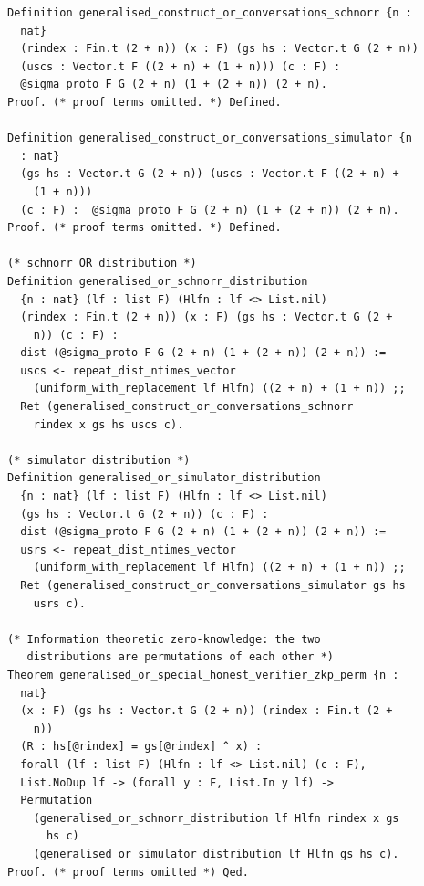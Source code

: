 \documentclass[sigconf,anonymous,review]{acmart}
\begin{document}
\begin{lstlisting}[frame=single, language=Coq, caption={Or-$\Sigma$-Protocol},
label={or_proof},captionpos=t, basicstyle=\ttfamily\footnotesize,
abovecaptionskip=-\medskipamount]
Definition generalised_construct_or_conversations_schnorr {n :
  nat} 
  (rindex : Fin.t (2 + n)) (x : F) (gs hs : Vector.t G (2 + n))
  (uscs : Vector.t F ((2 + n) + (1 + n))) (c : F) : 
  @sigma_proto F G (2 + n) (1 + (2 + n)) (2 + n).
Proof. (* proof terms omitted. *) Defined.

Definition generalised_construct_or_conversations_simulator {n
  : nat} 
  (gs hs : Vector.t G (2 + n)) (uscs : Vector.t F ((2 + n) +
    (1 + n)))  
  (c : F) :  @sigma_proto F G (2 + n) (1 + (2 + n)) (2 + n).
Proof. (* proof terms omitted. *) Defined.

(* schnorr OR distribution *)
Definition generalised_or_schnorr_distribution  
  {n : nat} (lf : list F) (Hlfn : lf <> List.nil) 
  (rindex : Fin.t (2 + n)) (x : F) (gs hs : Vector.t G (2 +
    n)) (c : F) : 
  dist (@sigma_proto F G (2 + n) (1 + (2 + n)) (2 + n)) := 
  uscs <- repeat_dist_ntimes_vector 
    (uniform_with_replacement lf Hlfn) ((2 + n) + (1 + n)) ;;
  Ret (generalised_construct_or_conversations_schnorr 
    rindex x gs hs uscs c).

(* simulator distribution *)
Definition generalised_or_simulator_distribution  
  {n : nat} (lf : list F) (Hlfn : lf <> List.nil) 
  (gs hs : Vector.t G (2 + n)) (c : F) : 
  dist (@sigma_proto F G (2 + n) (1 + (2 + n)) (2 + n)) :=
  usrs <- repeat_dist_ntimes_vector 
    (uniform_with_replacement lf Hlfn) ((2 + n) + (1 + n)) ;;
  Ret (generalised_construct_or_conversations_simulator gs hs
    usrs c).

(* Information theoretic zero-knowledge: the two 
   distributions are permutations of each other *)
Theorem generalised_or_special_honest_verifier_zkp_perm {n :
  nat} 
  (x : F) (gs hs : Vector.t G (2 + n)) (rindex : Fin.t (2 +
    n)) 
  (R : hs[@rindex] = gs[@rindex] ^ x) :
  forall (lf : list F) (Hlfn : lf <> List.nil) (c : F),
  List.NoDup lf -> (forall y : F, List.In y lf) ->
  Permutation 
    (generalised_or_schnorr_distribution lf Hlfn rindex x gs
      hs c)
    (generalised_or_simulator_distribution lf Hlfn gs hs c).
Proof. (* proof terms omitted *) Qed.
\end{lstlisting}
\end{document}
